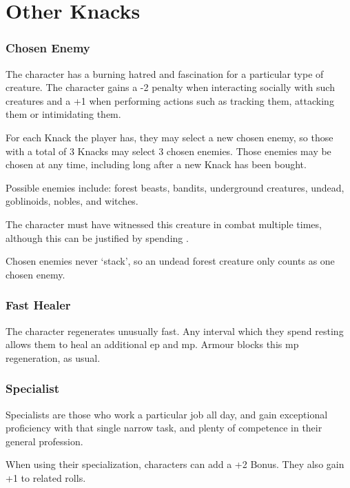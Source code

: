 \section{Other Knacks}

\begin{multicols}{2}

\subsubsection{Chosen Enemy}

The character has a burning hatred and fascination for a particular type of creature.
The character gains a -2 penalty when interacting socially with such creatures and a +1 when performing actions such as tracking them, attacking them or intimidating them.

For each Knack the player has, they may select a new chosen enemy, so those with a total of 3 Knacks may select 3 chosen enemies. Those enemies may be chosen at any time, including long after a new Knack has been bought.

Possible enemies include: forest beasts, bandits, underground creatures, undead, goblinoids, nobles, and witches.

The character must have witnessed this creature in combat multiple times, although this can be justified by spending .%

Chosen enemies never `stack', so an undead forest creature only counts as one chosen enemy.

\subsubsection{Fast Healer}

The character regenerates unusually fast.
Any \gls{interval} which they spend resting allows them to heal an additional \gls{ep} and \gls{mp}.
Armour blocks this \gls{mp} regeneration, as usual.

\subsubsection{Specialist}
\label{specialist}

Specialists are those who work a particular job all day, and gain exceptional proficiency with that single narrow task, and plenty of competence in their general profession.

When using their specialization, characters can add a +2 Bonus.
They also gain +1 to related rolls.


\end{multicols}
